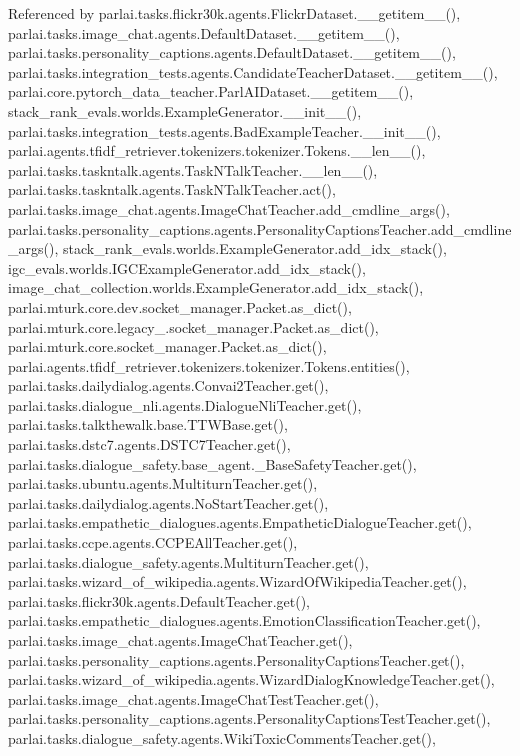 Referenced by parlai.\+tasks.\+flickr30k.\+agents.\+Flickr\+Dataset.\+\_\+\+\_\+getitem\+\_\+\+\_\+(), parlai.\+tasks.\+image\+\_\+chat.\+agents.\+Default\+Dataset.\+\_\+\+\_\+getitem\+\_\+\+\_\+(), parlai.\+tasks.\+personality\+\_\+captions.\+agents.\+Default\+Dataset.\+\_\+\+\_\+getitem\+\_\+\+\_\+(), parlai.\+tasks.\+integration\+\_\+tests.\+agents.\+Candidate\+Teacher\+Dataset.\+\_\+\+\_\+getitem\+\_\+\+\_\+(), parlai.\+core.\+pytorch\+\_\+data\+\_\+teacher.\+Parl\+A\+I\+Dataset.\+\_\+\+\_\+getitem\+\_\+\+\_\+(), stack\+\_\+rank\+\_\+evals.\+worlds.\+Example\+Generator.\+\_\+\+\_\+init\+\_\+\+\_\+(), parlai.\+tasks.\+integration\+\_\+tests.\+agents.\+Bad\+Example\+Teacher.\+\_\+\+\_\+init\+\_\+\+\_\+(), parlai.\+agents.\+tfidf\+\_\+retriever.\+tokenizers.\+tokenizer.\+Tokens.\+\_\+\+\_\+len\+\_\+\+\_\+(), parlai.\+tasks.\+taskntalk.\+agents.\+Task\+N\+Talk\+Teacher.\+\_\+\+\_\+len\+\_\+\+\_\+(), parlai.\+tasks.\+taskntalk.\+agents.\+Task\+N\+Talk\+Teacher.\+act(), parlai.\+tasks.\+image\+\_\+chat.\+agents.\+Image\+Chat\+Teacher.\+add\+\_\+cmdline\+\_\+args(), parlai.\+tasks.\+personality\+\_\+captions.\+agents.\+Personality\+Captions\+Teacher.\+add\+\_\+cmdline\+\_\+args(), stack\+\_\+rank\+\_\+evals.\+worlds.\+Example\+Generator.\+add\+\_\+idx\+\_\+stack(), igc\+\_\+evals.\+worlds.\+I\+G\+C\+Example\+Generator.\+add\+\_\+idx\+\_\+stack(), image\+\_\+chat\+\_\+collection.\+worlds.\+Example\+Generator.\+add\+\_\+idx\+\_\+stack(), parlai.\+mturk.\+core.\+dev.\+socket\+\_\+manager.\+Packet.\+as\+\_\+dict(), parlai.\+mturk.\+core.\+legacy\+\_.\+socket\+\_\+manager.\+Packet.\+as\+\_\+dict(), parlai.\+mturk.\+core.\+socket\+\_\+manager.\+Packet.\+as\+\_\+dict(), parlai.\+agents.\+tfidf\+\_\+retriever.\+tokenizers.\+tokenizer.\+Tokens.\+entities(), parlai.\+tasks.\+dailydialog.\+agents.\+Convai2\+Teacher.\+get(), parlai.\+tasks.\+dialogue\+\_\+nli.\+agents.\+Dialogue\+Nli\+Teacher.\+get(), parlai.\+tasks.\+talkthewalk.\+base.\+T\+T\+W\+Base.\+get(), parlai.\+tasks.\+dstc7.\+agents.\+D\+S\+T\+C7\+Teacher.\+get(), parlai.\+tasks.\+dialogue\+\_\+safety.\+base\+\_\+agent.\+\_\+\+Base\+Safety\+Teacher.\+get(), parlai.\+tasks.\+ubuntu.\+agents.\+Multiturn\+Teacher.\+get(), parlai.\+tasks.\+dailydialog.\+agents.\+No\+Start\+Teacher.\+get(), parlai.\+tasks.\+empathetic\+\_\+dialogues.\+agents.\+Empathetic\+Dialogue\+Teacher.\+get(), parlai.\+tasks.\+ccpe.\+agents.\+C\+C\+P\+E\+All\+Teacher.\+get(), parlai.\+tasks.\+dialogue\+\_\+safety.\+agents.\+Multiturn\+Teacher.\+get(), parlai.\+tasks.\+wizard\+\_\+of\+\_\+wikipedia.\+agents.\+Wizard\+Of\+Wikipedia\+Teacher.\+get(), parlai.\+tasks.\+flickr30k.\+agents.\+Default\+Teacher.\+get(), parlai.\+tasks.\+empathetic\+\_\+dialogues.\+agents.\+Emotion\+Classification\+Teacher.\+get(), parlai.\+tasks.\+image\+\_\+chat.\+agents.\+Image\+Chat\+Teacher.\+get(), parlai.\+tasks.\+personality\+\_\+captions.\+agents.\+Personality\+Captions\+Teacher.\+get(), parlai.\+tasks.\+wizard\+\_\+of\+\_\+wikipedia.\+agents.\+Wizard\+Dialog\+Knowledge\+Teacher.\+get(), parlai.\+tasks.\+image\+\_\+chat.\+agents.\+Image\+Chat\+Test\+Teacher.\+get(), parlai.\+tasks.\+personality\+\_\+captions.\+agents.\+Personality\+Captions\+Test\+Teacher.\+get(), parlai.\+tasks.\+dialogue\+\_\+safety.\+agents.\+Wiki\+Toxic\+Comments\+Teacher.\+get(), 
